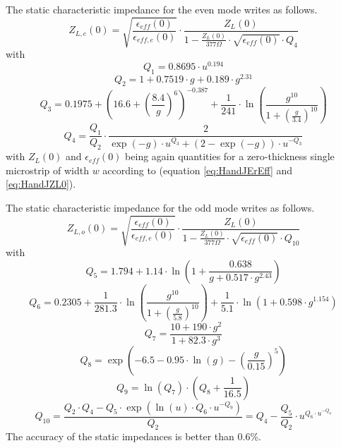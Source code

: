\documentclass[10pt]{report}
\begin{document}
The static characteristic impedance for the even mode writes as follows.
\begin{equation}
Z_{L,e}(0) = \sqrt{\frac{\epsilon_{eff}(0)}{\epsilon_{eff,e}(0)}} \cdot
             \frac{Z_L(0)}{1 - \frac{Z_L(0)}{377\Omega} \cdot \sqrt{\epsilon_{eff}(0)} \cdot Q_4}
\end{equation}
with
\begin{equation}
Q_1 = 0.8695\cdot u^{0.194}
\end{equation}
\begin{equation}
Q_2 = 1 + 0.7519\cdot g + 0.189\cdot g^{2.31}
\end{equation}
\begin{equation}
Q_3 = 0.1975 + \left( 16.6 + \left( \frac{8.4}{g} \right) ^6 \right) ^{-0.387}
     + \frac{1}{241} \cdot \ln\left( \frac{g^{10}}{1+\left( \frac{g}{3.4}\right) ^{10}} \right)
\end{equation}
\begin{equation}
Q_4 = \frac{Q_1}{Q_2}\cdot \frac{2}{ \exp(-g)\cdot u^{Q_3} + (2-\exp(-g))\cdot u^{-Q_3} }
\end{equation}
with $Z_L(0)$ and $\epsilon_{eff}(0)$  being again quantities for
a zero-thickness single microstrip of width $w$ according to
\cite{Hammerstad} (equation \ref{eq:HandJErEff} and \ref{eq:HandJZL0}).

\addvspace{12pt}

The static characteristic impedance for the odd mode writes as follows.
\begin{equation}
Z_{L,o}(0) = \sqrt{\frac{\epsilon_{eff}(0)}{\epsilon_{eff,e}(0)}} \cdot
             \frac{Z_L(0)}{1 - \frac{Z_L(0)}{377\Omega} \cdot \sqrt{\epsilon_{eff}(0)} \cdot Q_{10}}
\end{equation}
with
\begin{equation}
Q_5 = 1.794 +1.14\cdot\ln\left( 1 + \frac{0.638}{g+0.517\cdot g^{2.43}} \right)
\end{equation}
\begin{equation}
Q_6 = 0.2305 + \frac{1}{281.3}\cdot \ln\left( \frac{g^{10}}{1+\left( \frac{g}{5.8}\right) ^{10}} \right)
     + \frac{1}{5.1}\cdot \ln(1+0.598\cdot g^{1.154})
\end{equation}
\begin{equation}
Q_7 = \frac{10+190\cdot g^2}{1+82.3\cdot g^3}
\end{equation}
\begin{equation}
Q_8 = \exp\left( -6.5 - 0.95\cdot\ln(g) - \left(\frac{g}{0.15}\right)^5 \right)
\end{equation}
\begin{equation}
Q_9 = \ln(Q_7)\cdot \left( Q_8 + \frac{1}{16.5} \right)
\end{equation}
\begin{equation}
Q_{10} = \frac{Q_2\cdot Q_4 - Q_5\cdot\exp\left( \ln(u)\cdot Q_6\cdot u^{-Q_9} \right)}{Q_2}
       = Q_4 - \frac{Q_5}{Q_2}\cdot u^{Q_6\cdot u^{-Q_9}}
\end{equation}
The accuracy of the static impedances is better than 0.6\%.
\end{document}
